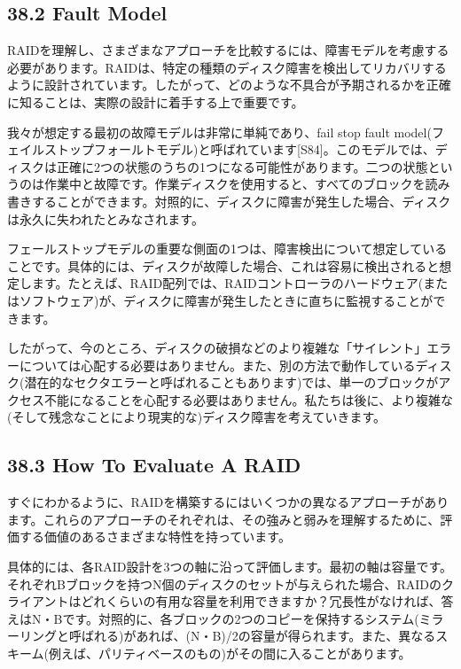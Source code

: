 \hypertarget{fault-model}{%
\subsection*{38.2 Fault Model}\label{fault-model}}

RAIDを理解し、さまざまなアプローチを比較するには、障害モデルを考慮する必要があります。RAIDは、特定の種類のディスク障害を検出してリカバリするように設計されています。したがって、どのような不具合が予期されるかを正確に知ることは、実際の設計に着手する上で重要です。

我々が想定する最初の故障モデルは非常に単純であり、fail stop fault
model(フェイルストップフォールトモデル)と呼ばれています{[}S84{]}。このモデルでは、ディスクは正確に2つの状態のうちの1つになる可能性があります。二つの状態というのは作業中と故障です。作業ディスクを使用すると、すべてのブロックを読み書きすることができます。対照的に、ディスクに障害が発生した場合、ディスクは永久に失われたとみなされます。

フェールストップモデルの重要な側面の1つは、障害検出について想定していることです。具体的には、ディスクが故障した場合、これは容易に検出されると想定します。たとえば、RAID配列では、RAIDコントローラのハードウェア(またはソフトウェア)が、ディスクに障害が発生したときに直ちに監視することができます。

したがって、今のところ、ディスクの破損などのより複雑な「サイレント」エラーについては心配する必要はありません。また、別の方法で動作しているディスク(潜在的なセクタエラーと呼ばれることもあります)では、単一のブロックがアクセス不能になることを心配する必要はありません。私たちは後に、より複雑な(そして残念なことにより現実的な)ディスク障害を考えていきます。

\hypertarget{how-to-evaluate-a-raid}{%
\subsection*{38.3 How To Evaluate A RAID}\label{how-to-evaluate-a-raid}}

すぐにわかるように、RAIDを構築するにはいくつかの異なるアプローチがあります。これらのアプローチのそれぞれは、その強みと弱みを理解するために、評価する価値のあるさまざまな特性を持っています。

具体的には、各RAID設計を3つの軸に沿って評価します。最初の軸は容量です。それぞれBブロックを持つN個のディスクのセットが与えられた場合、RAIDのクライアントはどれくらいの有用な容量を利用できますか？冗長性がなければ、答えはN・Bです。対照的に、各ブロックの2つのコピーを保持するシステム(ミラーリングと呼ばれる)があれば、(N・B)/2の容量が得られます。また、異なるスキーム(例えば、パリティベースのもの)がその間に入ることがあります。

